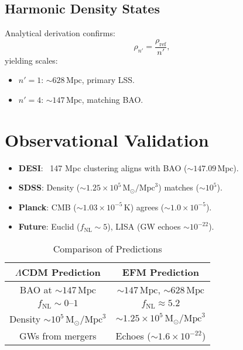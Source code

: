 \documentclass{article}
\begin{document}
\subsection{Harmonic Density States}
Analytical derivation confirms:
\begin{equation}
\rho_{n'} = \frac{\rho_{\text{ref}}}{n'},
\label{eq:harmonic}
\end{equation}
yielding scales:
\begin{itemize}
    \item \( n' = 1 \): \(\sim 628 \, \text{Mpc}\), primary LSS.
    \item \( n' = 4 \): \(\sim 147 \, \text{Mpc}\), matching BAO.
\end{itemize}

\section{Observational Validation}
\begin{itemize}
    \item \textbf{DESI}: ~147 Mpc clustering aligns with BAO (\(\sim 147.09 \, \text{Mpc}\)).
    \item \textbf{SDSS}: Density (\(\sim 1.25 \times 10^5 \, \text{M}_\odot/\text{Mpc}^3\)) matches (\(\sim 10^5\)).
    \item \textbf{Planck}: CMB (\(\sim 1.03 \times 10^{-5} \, \text{K}\)) agrees (\(\sim 1.0 \times 10^{-5}\)).
    \item \textbf{Future}: Euclid (\( f_{\text{NL}} \sim 5 \)), LISA (GW echoes \(\sim 10^{-22}\)).
\end{itemize}

\begin{table}[h]
    \centering
    \begin{tabular}{|c|c|}
        \hline
        \textbf{\(\Lambda\)CDM Prediction} & \textbf{EFM Prediction} \\
        \hline
        BAO at \(\sim 147 \, \text{Mpc}\) & \(\sim 147 \, \text{Mpc}\), \(\sim 628 \, \text{Mpc}\) \\
        \( f_{\text{NL}} \sim 0–1 \) & \( f_{\text{NL}} \approx 5.2 \) \\
        Density \(\sim 10^5 \, \text{M}_\odot/\text{Mpc}^3\) & \(\sim 1.25 \times 10^5 \, \text{M}_\odot/\text{Mpc}^3\) \\
        GWs from mergers & Echoes (\(\sim 1.6 \times 10^{-22}\)) \\
        \hline
    \end{tabular}
    \caption{Comparison of Predictions}
    \label{tab:predictions}
\end{table}
\end{document}

